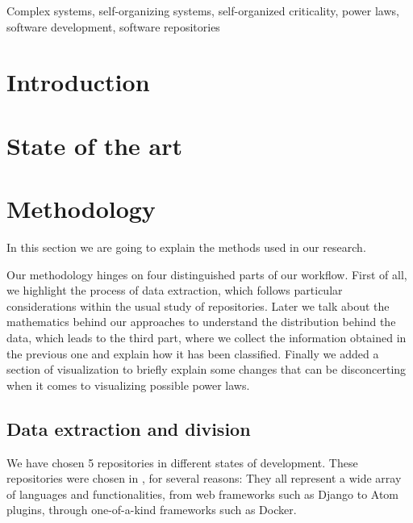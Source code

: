 \documentclass[conference]{IEEEtran}
\begin{document}
\begin{IEEEkeywords}
  Complex systems, self-organizing systems, self-organized
  criticality, power laws, software development, software repositories
\end{IEEEkeywords}


\section{Introduction}\label{introduction}




\section{State of the art}\label{soa}





\section{Methodology}
\label{sec:method}

In this section we are going to explain the methods used in our
research.

Our methodology hinges on four distinguished parts of our workflow.
First of all, we highlight the process of data extraction, which
follows particular considerations within the usual study of
repositories. Later we talk about the mathematics behind our
approaches to understand the distribution behind the data, which leads
to the third part, where we collect the information obtained in the
previous one and explain how it has been classified. Finally we added
a section of visualization to briefly explain some changes that can be
disconcerting when it comes to visualizing possible power laws.


\subsection{Data extraction and division}
We have chosen 5 repositories in different states of development.
These repositories were chosen in \cite{Merelo2016:repomining}, for
several reasons: They all represent a wide array of languages and
functionalities, from web frameworks such as Django to Atom plugins,
through one-of-a-kind frameworks such as Docker.
\end{document}
